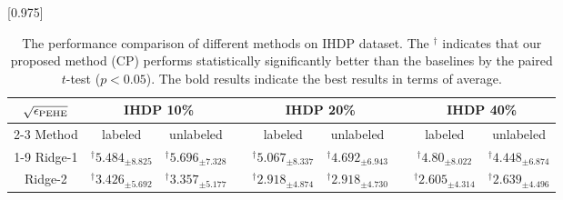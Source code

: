 \begin{table}[tbp]
\caption{The performance comparison of different methods on IHDP dataset. The $^\dagger$ indicates that our proposed method (CP) performs statistically significantly better than the baselines by the paired $t$-test ($p<0.05$). The bold results indicate the best results in terms of average.}\label{table:ihdp}
\scalebox{0.975}[0.975]
{
\centering
\begin{tabular} {ccccccccc }
\toprule[2pt]
       $ \sqrt{\epsilon_{\rm PEHE}} $         & \multicolumn{2}{c}{ \bf{IHDP} 10\%}        &              & \multicolumn{2}{c}{\bf{IHDP} 20\%}& &  \multicolumn{2}{c}{\bf{IHDP} 40\%}      \\[3pt]\cmidrule{2-3}\cmidrule{5-6}\cmidrule{8-9}
Method                      & labeled & unlabeled & \multicolumn{1}{l}{} & labeled & unlabeled & \multicolumn{1}{l}{} & labeled & unlabeled\\[3pt] \cmidrule{1-9}
Ridge-1   &        $^\dagger5.484_{\pm{8.825}}$ &  $^\dagger5.696_{\pm{7.328}}$ & \multicolumn{1}{l}{} &   $^\dagger5.067_{\pm{8.337}}$  &  $^\dagger4.692_{\pm{6.943}}$       &   &$^\dagger4.80_{\pm{8.022}}$   & $^\dagger4.448_{\pm{6.874}}$      \\[3pt]
Ridge-2   &        $^\dagger3.426_{\pm{5.692}}$      &       $^\dagger3.357_{\pm{5.177}}$       & \multicolumn{1}{l}{} &  $^\dagger2.918_{\pm{4.874}}$  &    $^\dagger2.918_{\pm{4.730}}$  &   &  $^\dagger2.605_{\pm{4.314}}$ & $^\dagger2.639_{\pm{4.496}}$      \\[3pt]


\end{tabular}}
\end{table}
